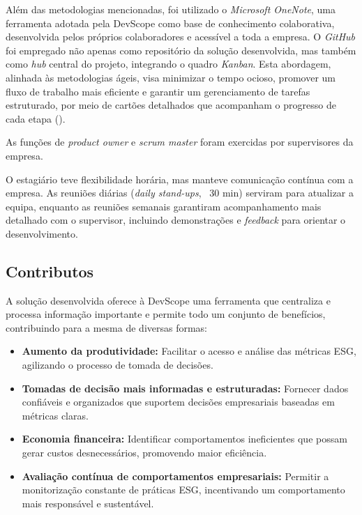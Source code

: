 Além das metodologias mencionadas, foi utilizado o \textit{Microsoft OneNote}, uma ferramenta adotada pela DevScope como base de conhecimento colaborativa, desenvolvida pelos próprios colaboradores e acessível a toda a empresa. O \textit{GitHub} foi empregado não apenas como repositório da solução desenvolvida, mas também como \textit{hub} central do projeto, integrando o quadro \textit{Kanban}. Esta abordagem, alinhada às metodologias ágeis, visa minimizar o tempo ocioso, promover um fluxo de trabalho mais eficiente e garantir um gerenciamento de tarefas estruturado, por meio de cartões detalhados que acompanham o progresso de cada etapa (\cite{Wakode2021Kanban}).

As funções de \textit{product owner} e \textit{scrum master} foram exercidas por supervisores da empresa.

O estagiário teve flexibilidade horária, mas manteve comunicação contínua com a empresa. As reuniões diárias (\textit{daily stand-ups}, ~30 min) serviram para atualizar a equipa, enquanto as reuniões semanais garantiram acompanhamento mais detalhado com o supervisor, incluindo demonstrações e \textit{feedback} para orientar o desenvolvimento.

\subsection{Contributos} 

A solução desenvolvida oferece à DevScope uma ferramenta que centraliza e processa informação importante e permite todo um conjunto de benefícios, contribuindo para a mesma de diversas formas:
\begin{itemize}
  \item \textbf{Aumento da produtividade:} Facilitar o acesso e análise das métricas ESG, agilizando o processo de tomada de decisões.
  \item \textbf{Tomadas de decisão mais informadas e estruturadas:} Fornecer dados confiáveis e organizados que suportem decisões empresariais baseadas em métricas claras.
  \item \textbf{Economia financeira:} Identificar comportamentos ineficientes que possam gerar custos desnecessários, promovendo maior eficiência.
  \item \textbf{Avaliação contínua de comportamentos empresariais:} Permitir a monitorização constante de práticas ESG, incentivando um comportamento mais responsável e sustentável.
\end{itemize}

